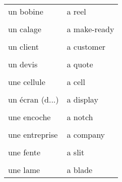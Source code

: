 \documentclass[
  10pt,
]{article}
\begin{document}
\begin{longtable}{ll}
un bobine & a reel\\

\cellcolor{gray!6}{ \vphantom{5}& }\\

\multirow[t]{-2}{*}{\raggedright\arraybackslash un calage} & \multirow[t]{-2}{*}{\raggedright\arraybackslash a make-ready}\\

\cellcolor{gray!6}{ \vphantom{4}& }\\

\multirow[t]{-2}{*}{\raggedright\arraybackslash un client} & \multirow[t]{-2}{*}{\raggedright\arraybackslash a customer}\\

\cellcolor{gray!6}{un dépliant} & \cellcolor{gray!6}{a folded leaflet}\\

un devis & a quote\\

\cellcolor{gray!6}{une caractéristique, une spécification} & \cellcolor{gray!6}{a feature}\\

une cellule & a cell\\

\cellcolor{gray!6}{une couche} & \cellcolor{gray!6}{a layer}\\

un écran (d...) & a display\\

\cellcolor{gray!6}{un écran (m...)} & \cellcolor{gray!6}{a monitor}\\

une encoche & a notch\\

\cellcolor{gray!6}{ \vphantom{3}& }\\

\multirow[t]{-2}{*}{\raggedright\arraybackslash une entreprise} & \multirow[t]{-2}{*}{\raggedright\arraybackslash a company}\\

\cellcolor{gray!6}{une étape} & \cellcolor{gray!6}{a step}\\

une fente & a slit\\

\cellcolor{gray!6}{une forme} & \cellcolor{gray!6}{a shape}\\

une lame & a blade\\


\end{longtable}
\end{document}
